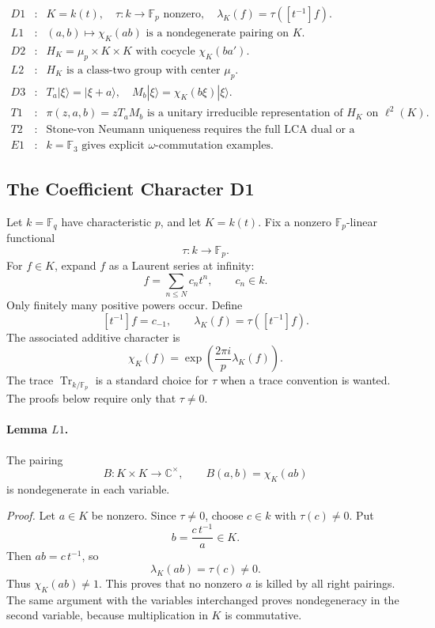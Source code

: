 \[
\begin{array}{rcl}
D1&:&K=k(t),\quad \tau:k\to\mathbb F_p\text{ nonzero},\quad
      \lambda_K(f)=\tau([t^{-1}]f).\\
L1&:&(a,b)\mapsto\chi_K(ab)\text{ is a nondegenerate pairing on }K.\\
D2&:&H_K=\mu_p\times K\times K
      \text{ with cocycle }\chi_K(ba').\\
L2&:&H_K\text{ is a class-two group with center }\mu_p.\\
D3&:&T_a|\xi\rangle=|\xi+a\rangle,\quad
      M_b|\xi\rangle=\chi_K(b\xi)|\xi\rangle.\\
T1&:&\pi(z,a,b)=zT_aM_b\text{ is a unitary irreducible representation
      of }H_K\text{ on }\ell^2(K).\\
T2&:&\text{Stone-von Neumann uniqueness requires the full LCA dual or a
      local/adelic completion.}\\
E1&:&k=\mathbb F_3\text{ gives explicit }\omega\text{-commutation examples.}
\end{array}
\]

\subsection{The Coefficient Character D1}

Let \(k=\mathbb F_q\) have characteristic \(p\), and let \(K=k(t)\).  Fix a
nonzero \(\mathbb F_p\)-linear functional
\[
  \tau:k\longrightarrow\mathbb F_p.
\]
For \(f\in K\), expand \(f\) as a Laurent series at infinity:
\[
  f=\sum_{n\le N} c_n t^n,\qquad c_n\in k.
\]
Only finitely many positive powers occur.  Define
\[
  [t^{-1}]f=c_{-1},
  \qquad
  \lambda_K(f)=\tau([t^{-1}]f).
\]
The associated additive character is
\[
  \chi_K(f)=\exp\!\left(\frac{2\pi i}{p}\lambda_K(f)\right).
\]
The trace \(\operatorname{Tr}_{k/\mathbb F_p}\) is a standard choice for
\(\tau\) when a trace convention is wanted.  The proofs below require only
that \(\tau\ne0\).

\paragraph{Lemma \(L1\).}
The pairing
\[
  B:K\times K\longrightarrow\mathbb C^\times,\qquad
  B(a,b)=\chi_K(ab)
\]
is nondegenerate in each variable.

\emph{Proof.}
Let \(a\in K\) be nonzero.  Since \(\tau\ne0\), choose \(c\in k\) with
\(\tau(c)\ne0\).  Put
\[
  b=\frac{c\,t^{-1}}{a}\in K.
\]
Then \(ab=c\,t^{-1}\), so
\[
  \lambda_K(ab)=\tau(c)\ne0.
\]
Thus \(\chi_K(ab)\ne1\).  This proves that no nonzero \(a\) is killed by all
right pairings.  The same argument with the variables interchanged proves
nondegeneracy in the second variable, because multiplication in \(K\) is
commutative.

